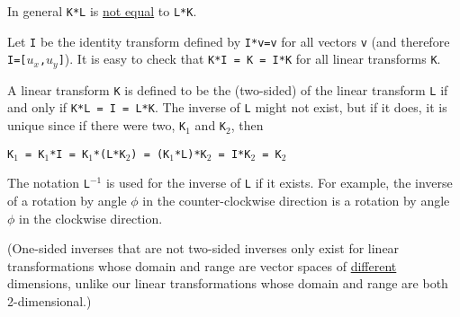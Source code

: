 \documentclass[12pt]{article}
\begin{document}
In general {\tt K*L} is \underline{not equal} to {\tt L*K}.

Let {\tt I} be the identity transform defined by
{\tt I*v=v} for all vectors {\tt v}  (and therefore {\tt I=[$u_x$,$u_y$]}).
It is easy to check that {\tt K*I = K = I*K} for all linear transforms
{\tt K}.

A linear transform {\tt K} is defined to be the (two-sided) 
of the linear transform {\tt L} if and only if {\tt K*L = I = L*K}.
The inverse of {\tt L} might not exist, but if it does, it is unique
since if there were two, {\tt K$_1$} and {\tt K$_2$}, then \\
\centerline{\tt K$_1$ = K$_1$*I = K$_1$*(L*K$_2$)
                      = (K$_1$*L)*K$_2$ = I*K$_2$ = K$_2$}
The notation {\tt L$^{-1}$} is used for the inverse of {\tt L} if it
exists.  For example, the inverse of a rotation by angle $\phi$ in the
counter-clockwise direction is a rotation by angle $\phi$ in the
clockwise direction.

(One-sided inverses that are not two-sided inverses only exist for
linear transformations whose domain and range are vector spaces of
\underline{different} dimensions, unlike our linear transformations
whose domain and range are both 2-dimensional.)



\newpage
\end{document}
